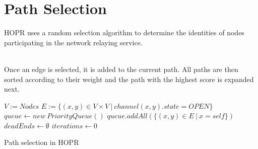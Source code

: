 \section{Path Selection}
HOPR uses a random selection algorithm to determine the identities of nodes participating in the network relaying service.
\begin{comment}
    

\\For each round, a subset $k$-of-$n$ nodes will be chosen where $n$ is the total number of nodes in the HOPR network. The selection is divided into two steps:
\begin{enumerate}
    \item Pre-selection:
          During this phase, a subset $m<<n$ nodes will be selected based on different factors:
          \begin{itemize}
              \item Availability
              \item Payment channel graph
              \item Stake
          \end{itemize}
          Each node gets a score that is proportional to the previously mentioned factors.
    \item Random selection:
          Each edge (from node $a$ to $b$) within the subset $m$ is assigned a random number $r_i$. Edges are then sorted by $r_i*score(edge_i)$
\end{enumerate}
\end{comment}
\\Once an edge is selected, it is added to the current path. All paths are then sorted according to their weight and the path with the highest score is expanded next.

\begin{algorithm}
    \SetAlgoNoLine
    \DontPrintSemicolon
    $ V := Nodes$\;
    $ E := \{ (x, y) \in V \times V \ | \ channel(x,y).state = OPEN \}$\;
    \;
    $queue \leftarrow new \ PriorityQueue()$\;
    $queue.addAll(\{ (x,y) \in E \ | \ x = self \})$\;
    $deadEnds \leftarrow \emptyset$\;
    $iterations \leftarrow 0$\;
    \Return{$\bot$}
    \caption{Path selection in HOPR}
\end{algorithm}

